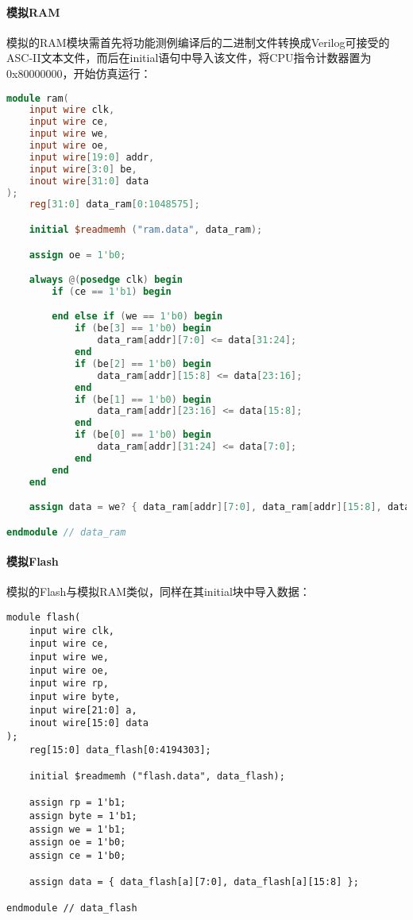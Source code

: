 \paragraph{模拟RAM}
模拟的RAM模块需首先将功能测例编译后的二进制文件转换成Verilog可接受的ASC-II文本文件，而后在initial语句中导入该文件，将CPU指令计数器置为0x80000000，开始仿真运行：

\begin{lstlisting}[language=verilog, caption={模拟RAM ram.v}]
module ram(
    input wire clk,
    input wire ce,
    input wire we,
    input wire oe,
    input wire[19:0] addr,
    input wire[3:0] be,
    inout wire[31:0] data
);
    reg[31:0] data_ram[0:1048575];

    initial $readmemh ("ram.data", data_ram);

    assign oe = 1'b0;

    always @(posedge clk) begin
        if (ce == 1'b1) begin

        end else if (we == 1'b0) begin
            if (be[3] == 1'b0) begin
                data_ram[addr][7:0] <= data[31:24];
            end
            if (be[2] == 1'b0) begin
                data_ram[addr][15:8] <= data[23:16];
            end
            if (be[1] == 1'b0) begin
                data_ram[addr][23:16] <= data[15:8];
            end
            if (be[0] == 1'b0) begin
                data_ram[addr][31:24] <= data[7:0];
            end
        end
    end

    assign data = we? { data_ram[addr][7:0], data_ram[addr][15:8], data_ram[addr][23:16], data_ram[addr][31:24] }: 32'bzzzzzzzzzzzzzzzzzzzzzzzzzzzzzzzz;

endmodule // data_ram
\end{lstlisting}


\paragraph{模拟Flash}
模拟的Flash与模拟RAM类似，同样在其initial块中导入数据：

\begin{lstlisting}
module flash(
    input wire clk,
    input wire ce,
    input wire we,
    input wire oe,
    input wire rp,
    input wire byte,
    input wire[21:0] a,
    inout wire[15:0] data
);
    reg[15:0] data_flash[0:4194303];

    initial $readmemh ("flash.data", data_flash);

    assign rp = 1'b1;
    assign byte = 1'b1;
    assign we = 1'b1;
    assign oe = 1'b0;
    assign ce = 1'b0;

    assign data = { data_flash[a][7:0], data_flash[a][15:8] };

endmodule // data_flash
\end{lstlisting}



